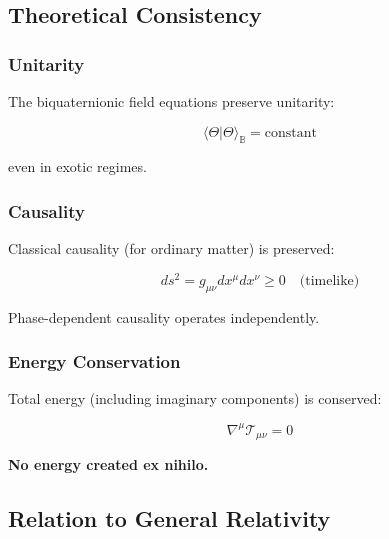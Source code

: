 \subsection{Theoretical Consistency}

\subsubsection{Unitarity}

The biquaternionic field equations preserve unitarity:

\begin{equation}
\langle \Theta | \Theta \rangle_\mathbb{B} = \text{constant}
\end{equation}

even in exotic regimes.

\subsubsection{Causality}

Classical causality (for ordinary matter) is preserved:

\begin{equation}
ds^2 = g_{\mu\nu} dx^\mu dx^\nu \geq 0 \quad \text{(timelike)}
\end{equation}

Phase-dependent causality operates independently.

\subsubsection{Energy Conservation}

Total energy (including imaginary components) is conserved:

\begin{equation}
\nabla^\mu \mathcal{T}_{\mu\nu} = 0
\end{equation}

\textbf{No energy created ex nihilo.}

\subsection{Relation to General Relativity}

